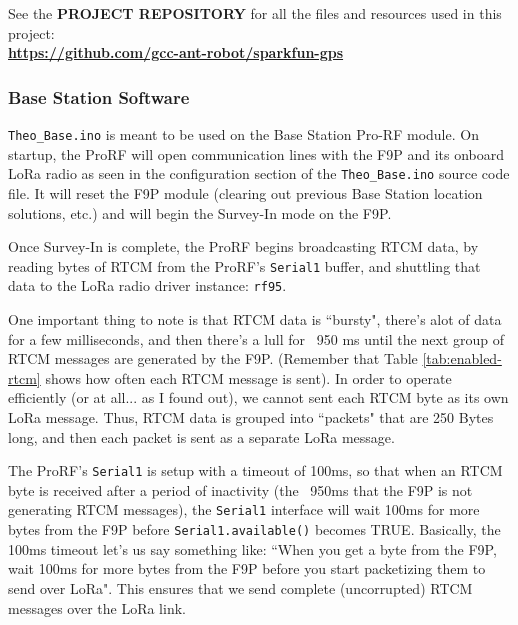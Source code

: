 \documentclass{article}%
\begin{document}
\begin{myquote} See the \textbf{PROJECT REPOSITORY} for all the files and resources used in this project:\\ \textbf{\url{https://github.com/gcc-ant-robot/sparkfun-gps}}
\end{myquote}

\subsubsection{Base Station Software}

\texttt{Theo\_Base.ino} is meant to be used on the Base Station Pro-RF module.  On startup, the ProRF will open communication lines with the F9P and its onboard LoRa radio as seen in the configuration section of the \texttt{Theo\_Base.ino} source code file.  It will reset the F9P module (clearing out previous Base Station location solutions, etc.) and will begin the Survey-In mode on the F9P.  

Once Survey-In is complete, the ProRF begins broadcasting RTCM data, by reading bytes of RTCM from the ProRF's \texttt{Serial1} buffer, and shuttling that data to the LoRa radio driver instance: \texttt{rf95}.

One important thing to note is that RTCM data is ``bursty", there's alot of data for a few milliseconds, and then there's a lull for ~950 ms until the next group of RTCM messages are generated by the F9P.  (Remember that Table \ref{tab:enabled-rtcm} shows how often each RTCM message is sent).   In order to operate efficiently (or at all... as I found out), we cannot sent each RTCM byte as its own LoRa message.
Thus, RTCM data is grouped into ``packets" that are 250 Bytes long, and then each packet is sent as a separate LoRa message.

The ProRF's \texttt{Serial1} is setup with a timeout of 100ms, so that when an RTCM byte is received after a period of inactivity (the ~950ms that the F9P is not generating RTCM messages), the \texttt{Serial1} interface will wait 100ms for more bytes from the F9P before \texttt{Serial1.available()} becomes TRUE. Basically, the 100ms timeout let's us say something like: ``When you get a byte from the F9P, wait 100ms for more bytes from the F9P before you start packetizing them to send over LoRa".  This ensures that we send complete (uncorrupted) RTCM messages over the LoRa link.
\end{document}
